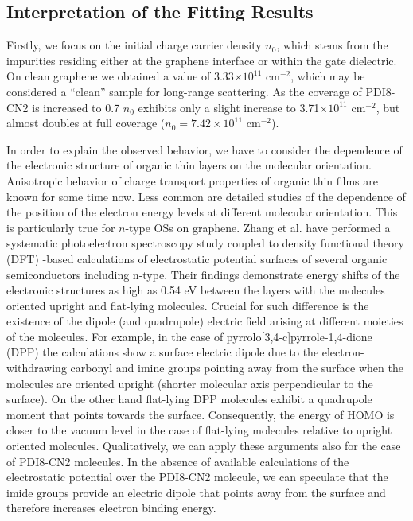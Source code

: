 \documentclass[preprint,aip,jap]{revtex4-2}
\begin{document}
\subsection{Interpretation of the Fitting Results}
\label{sec:interp}

Firstly, we focus on the initial charge carrier density $n_0$, which stems from the impurities residing either at the graphene interface or within the gate dielectric.
 On clean graphene we obtained a value of 3.33$\times 10^{11}$ cm$^{-2}$, which may be considered a ``clean'' sample for long-range scattering.
  As the coverage of PDI8-CN2 is increased to 0.7 $n_0$ exhibits only a slight increase to 3.71$\times 10^{11}$ cm$^{-2}$, but almost doubles at full coverage ($n_{0}=7.42\times 10^{11}$ cm$^{-2}$).

In order to explain the observed behavior, we have to consider the dependence of the electronic structure of organic thin layers on the molecular orientation.
  Anisotropic behavior of charge transport properties of organic thin films are known for some time now\cite{sundar-2004}.
 Less common are detailed studies of the dependence of the position of the electron energy levels at different molecular orientation.
 This is particularly true for $n$-type OSs on graphene.
 Zhang et al.
\cite{zhang-2016d} have performed a systematic photoelectron spectroscopy study coupled to density functional theory (DFT) -based calculations of electrostatic potential surfaces of several organic semiconductors including n-type.
 Their findings demonstrate energy shifts of the electronic structures as high as 0.54 eV between the layers with the molecules oriented upright and flat-lying molecules.
  Crucial for such difference is the existence of the dipole (and quadrupole) electric field arising at different moieties of the molecules.
 For example, in the case of pyrrolo[3,4-c]pyrrole-1,4-dione (DPP)  the calculations show a surface electric dipole due to the electron-withdrawing carbonyl and imine groups pointing  away from the surface when the molecules are oriented upright (shorter molecular axis perpendicular to the surface).
 On the other hand flat-lying DPP molecules exhibit a quadrupole moment that points towards the surface.
 Consequently, the energy of HOMO is closer to the vacuum level in the case of flat-lying molecules relative to upright oriented molecules.
Qualitatively, we can apply these arguments also for the case of PDI8-CN2 molecules.
 In the absence of available calculations of the electrostatic potential over the PDI8-CN2 molecule, we can speculate that the imide groups provide an electric dipole that points away from the surface and therefore increases electron binding energy.
\end{document}
